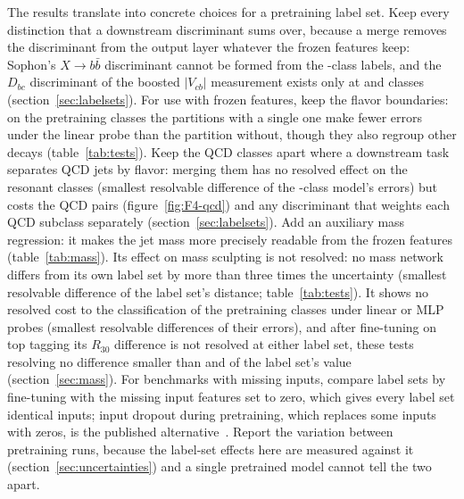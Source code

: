 The results translate into concrete choices for a pretraining label set. Keep every distinction that a
downstream discriminant sums over, because a merge removes the discriminant from the output layer
whatever the frozen features keep: Sophon's $X\to b\bar{b}$ discriminant cannot be formed from the
\Kmid-class labels, and the $D_{bc}$ discriminant of the boosted $|V_{cb}|$ measurement exists only at
\Kfull{} and \Kres{} classes (section~\ref{sec:labelsets}). For use with frozen features, keep the flavor
boundaries: on the pretraining classes the partitions with a single one make fewer errors under the linear probe than
the partition without, though they also regroup other decays
(table~\ref{tab:tests}). Keep the QCD classes apart where a downstream task separates QCD jets by
flavor: merging them has no resolved effect on the resonant classes (smallest resolvable difference
\MlstPwResonantRes{} of the \Kfull-class model's errors) but costs the QCD pairs
(figure~\ref{fig:F4-qcd}) and any discriminant that weights each QCD subclass separately
(section~\ref{sec:labelsets}). %
Add an auxiliary mass regression: it makes the jet mass more precisely readable from the frozen features
(table~\ref{tab:mass}). Its effect on mass sculpting is not resolved: no mass network differs from its own label set by more
than three times the uncertainty (smallest resolvable difference \MlstPwSculptMass{} of the label set's distance;
table~\ref{tab:tests}). It shows no resolved cost to the classification of the pretraining classes under linear or
MLP probes (smallest resolvable differences \MlstPwMassClsAll{} of their errors), and after fine-tuning on top tagging its $R_{30}$ difference is not resolved at either label
set, these tests resolving no difference smaller than \MlstPwTopMassRes{} and \MlstPwTopMassCoarse{} of the
label set's value (section~\ref{sec:mass}). %
For benchmarks with missing inputs, compare label sets by fine-tuning with the missing input features
set to zero, which gives every label set identical inputs; input dropout during pretraining, which
replaces some inputs with zeros, is the published alternative~\cite{omnilearn,jpjepa}.
Report the variation between pretraining runs, because the
label-set effects here are measured against it (section~\ref{sec:uncertainties}) and a single
pretrained model cannot tell the two apart.

